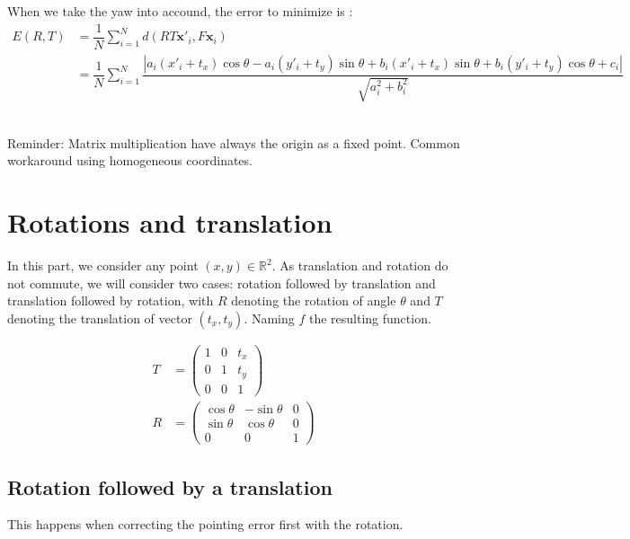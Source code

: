 \documentclass[paper=a4, fontsize=11pt]{article}
\begin{document}
When we take the yaw into accound, the error to minimize is :
\begin{align*}
E(R, T) &= \dfrac{1}{N} \sum\limits_{i=1}^{N} d(RT\textbf{x}'_i, F\textbf{x}_i) \\
&= \dfrac{1}{N} \sum\limits_{i=1}^{N} \dfrac{|a_i(x'_i + t_x)\cos \theta  - a_i (y'_i + t_y)\sin \theta  + b_i(x'_i + t_x)\sin \theta  + b_i  (y'_i + t_y)\cos \theta+ c_i|}{\sqrt{a_i^2 + b_i^2}}
\end{align*}\\


\appendix

Reminder: Matrix multiplication have always the origin as a fixed point. Common workaround using homogeneous coordinates.

\section{Rotations and translation}

In this part, we consider any point \((x, y) \in \mathbb{R}^2\). As translation and rotation do not commute, we will consider two cases: rotation followed by translation and translation followed by rotation, with \(R\) denoting the rotation of angle \(\theta\) and \(T\) denoting the translation of vector \((t_x, t_y)\). Naming \(f\) the resulting function.

\begin{align*}
	T &=
		\begin{pmatrix}
			1 & 0 & t_x \\
			0 & 1 & t_y \\
			0 & 0 & 1
		\end{pmatrix}
		\\
	R &=
		\begin{pmatrix}
			\cos \theta & -\sin \theta & 0 \\
			\sin \theta & \cos \theta & 0 \\
			0 & 0 & 1
		\end{pmatrix}
\end{align*}


\subsection{Rotation followed by a translation}
This happens when correcting the pointing error first with the rotation.
\end{document}
